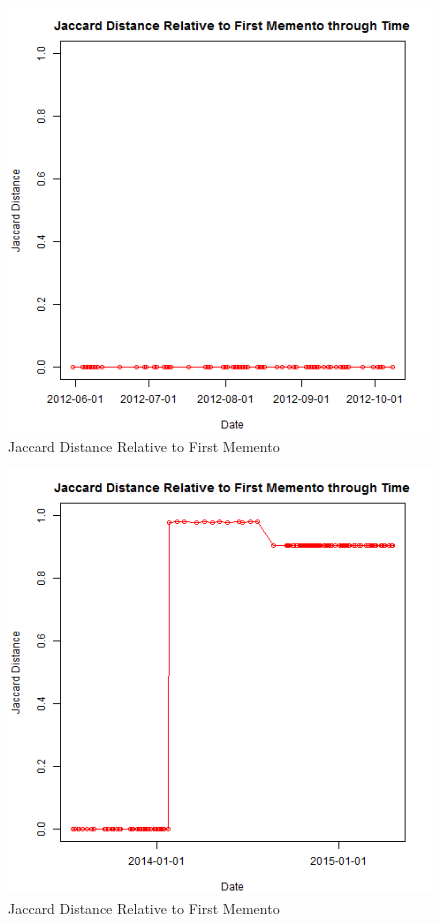 \documentclass[12pt]{Report}
\begin{document}
 
\begin{figure}[ht]    
    \begin{center}
        \includegraphics[scale=0.60]{link2.png}
        \caption{Jaccard Distance Relative to First Memento }
        \label{Jaccard Distance Relative to First Memento}
    \end{center}
\end{figure}
\newpage 

\begin{figure}[ht]    
    \begin{center}
        \includegraphics[scale=0.60]{link3.png}
        \caption{Jaccard Distance Relative to First Memento }
        \label{Jaccard Distance Relative to First Memento}
    \end{center}
\end{figure}
\newpage
\end{document}
